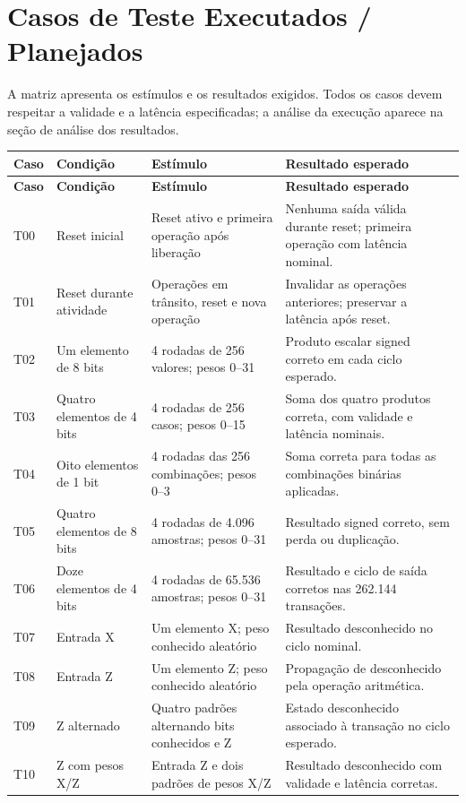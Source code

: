 \documentclass[12pt,a4paper]{article}
\begin{document}
\section{Casos de Teste Executados / Planejados}
A matriz apresenta os estímulos e os resultados exigidos. Todos os casos devem respeitar a validade e a latência especificadas; a análise da execução aparece na seção de análise dos resultados.
\small
\begin{longtable}{|p{1.1cm}|p{4.5cm}|p{7cm}|p{10cm}|}
\hline\textbf{Caso} & \textbf{Condição} & \textbf{Estímulo} & \textbf{Resultado esperado}\\\hline
\endfirsthead
\hline\textbf{Caso} & \textbf{Condição} & \textbf{Estímulo} & \textbf{Resultado esperado}\\\hline
\endhead
T00 & Reset inicial & Reset ativo e primeira operação após liberação & Nenhuma saída válida durante reset; primeira operação com latência nominal. \\\hline
T01 & Reset durante atividade & Operações em trânsito, reset e nova operação & Invalidar as operações anteriores; preservar a latência após reset. \\\hline
T02 & Um elemento de 8 bits & 4 rodadas de 256 valores; pesos 0--31 & Produto escalar signed correto em cada ciclo esperado. \\\hline
T03 & Quatro elementos de 4 bits & 4 rodadas de 256 casos; pesos 0--15 & Soma dos quatro produtos correta, com validade e latência nominais. \\\hline
T04 & Oito elementos de 1 bit & 4 rodadas das 256 combinações; pesos 0--3 & Soma correta para todas as combinações binárias aplicadas. \\\hline
T05 & Quatro elementos de 8 bits & 4 rodadas de 4.096 amostras; pesos 0--31 & Resultado signed correto, sem perda ou duplicação. \\\hline
T06 & Doze elementos de 4 bits & 4 rodadas de 65.536 amostras; pesos 0--31 & Resultado e ciclo de saída corretos nas 262.144 transações. \\\hline
T07 & Entrada X & Um elemento X; peso conhecido aleatório & Resultado desconhecido no ciclo nominal. \\\hline
T08 & Entrada Z & Um elemento Z; peso conhecido aleatório & Propagação de desconhecido pela operação aritmética. \\\hline
T09 & Z alternado & Quatro padrões alternando bits conhecidos e Z & Estado desconhecido associado à transação no ciclo esperado. \\\hline
T10 & Z com pesos X/Z & Entrada Z e dois padrões de pesos X/Z & Resultado desconhecido com validade e latência corretas. \\\hline

\end{longtable}
\end{document}
